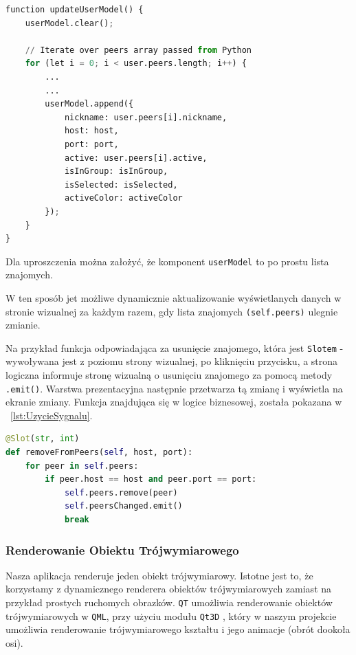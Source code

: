 \begin{lstlisting}[language=Python, caption={Slot w QML obsługujący wyświetlanie zmienionej listy znajomych}, label={lst:update}]
function updateUserModel() {
    userModel.clear();

    // Iterate over peers array passed from Python
    for (let i = 0; i < user.peers.length; i++) {
        ...
        ...
        userModel.append({
            nickname: user.peers[i].nickname,
            host: host,
            port: port,
            active: user.peers[i].active,
            isInGroup: isInGroup,
            isSelected: isSelected,
            activeColor: activeColor
        });
    }
}
\end{lstlisting}
Dla uproszczenia można założyć, że komponent \texttt{userModel} to po prostu lista znajomych.
\par
W ten sposób jet możliwe dynamicznie aktualizowanie wyświetlanych danych w stronie wizualnej za każdym razem, gdy lista znajomych \texttt{(self.peers)} ulegnie zmianie.

Na przykład funkcja odpowiadająca za usunięcie znajomego, która jest \texttt{Slotem} - wywoływana jest z poziomu strony wizualnej, po kliknięciu przycisku, a strona logiczna informuje stronę wizualną o usunięciu znajomego za pomocą metody \texttt{.emit()}. Warstwa prezentacyjna następnie przetwarza tą zmianę i wyświetla na ekranie zmiany. Funkcja znajdująca się w logice biznesowej, została pokazana w \lstlistingname{~\ref{lst:UzycieSygnalu}}.
\begin{lstlisting}[language=Python, caption={Przykładowe użycie sygnału dla listy znajomych}, label={lst:UzycieSygnalu}]
@Slot(str, int)
def removeFromPeers(self, host, port):
    for peer in self.peers:
        if peer.host == host and peer.port == port:
            self.peers.remove(peer)
            self.peersChanged.emit()
            break
\end{lstlisting}

\subsubsection{Renderowanie Obiektu Trójwymiarowego}
\label{sec:RenderowanieObiektuTrójwymiarowego}
Nasza aplikacja renderuje jeden obiekt trójwymiarowy. Istotne jest to, że korzystamy z dynamicznego renderera obiektów trójwymiarowych zamiast na przykład prostych ruchomych obrazków.
\texttt{QT} umożliwia renderowanie obiektów trójwymiarowych w \texttt{QML}, przy użyciu modułu \texttt{Qt3D} \cite{QT3D}, który w naszym projekcie umożliwia renderowanie trójwymiarowego kształtu i jego animacje (obrót dookoła osi).

